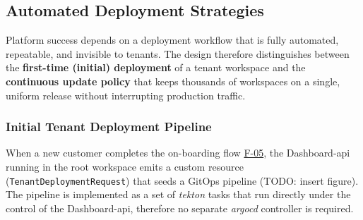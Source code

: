 \documentclass[11pt, a4paper, oneside, listof=totoc]{scrartcl}
\begin{document}
        \clearpage

        \subsection{Automated Deployment Strategies}\label{subsec:deploymentStrategies}
            Platform success depends on a deployment workflow that is fully automated, repeatable,
            and invisible to tenants.
            The design therefore distinguishes between the \textbf{first-time (initial) deployment}
            of a tenant workspace and the \textbf{continuous update policy} that keeps thousands of
            workspaces on a single, uniform release without interrupting production traffic.

            \subsubsection{Initial Tenant Deployment Pipeline}\label{subsubsec:initialDeeployment}
                When a new customer completes the on-boarding flow \hyperlink{f5}{F-05}, the
                Dashboard-\gls{api} running in the root workspace emits a custom resource
                (\texttt{TenantDeploymentRequest}) that seeds a GitOps pipeline
                (TODO: insert figure).
                The pipeline is implemented as a set of \textit{\gls{tekton}} tasks that run
                directly under the control of the Dashboard-\gls{api}, therefore no separate
                \textit{\gls{argocd}} controller is required.
\end{document}
